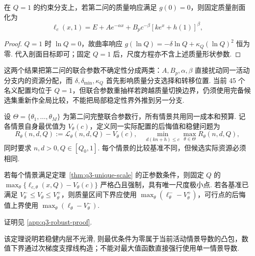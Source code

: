 \begin{corollary}[质量饱和分支的形状参数隔离]\label{cor:q3-saturated-shape-isolation}
在 $Q=1$ 的约束分支上，若第二问的质量响应满足 $g(0)=0$，则固定质量剖面化为
\[
\ell_c(x,1)=E+Ae^{-\alpha x}+B_pc^{-\beta}[ke^x+h(1)]^{\beta},
\]
\end{corollary}
\begin{proof}
$Q=1$ 时 $\ln Q=0$，故曲率响应 $g(\ln Q)=-\delta\ln Q+\kappa_Q(\ln Q)^2$ 恒为零. 代入剖面目标即可；固定 $Q=1$ 后，尺度方程亦不含上述质量形状参数. 
\end{proof}
这两个结果把第二问的联合参数不确定性分成两类：$A,B_p,\alpha,\beta$ 直接扰动同一活动分支内的资源分配，而 $\delta,\delta_{\min},\kappa_Q$ 首先影响质量分支选择和转移位置. 当前 45 个名义配置均位于 $Q=1$，但联合参数重抽样若跨越质量切换边界，仍须使用完备候选集重新作全局比较，不能把局部稳定性界外推到另一分支. 

\begin{definition}[有限参数情景的最大后悔值]\label{def:q3-minimax-regret}
设 $\Theta=\{\theta_1,\ldots,\theta_M\}$ 为第二问完整联合参数行，所有情景共用同一成本和预算. 记各情景自身最优值为 $V_\theta(c)$，定义同一实际配置的后悔值和稳健问题为
\begin{equation}\label{eq:q3-regret-v26}
R_\theta(n,d,Q):=\mathcal L_\theta(n,d,Q)-V_\theta(c),
\quad \min_{d(kn+h)\le c}\max_{\theta\in\Theta}R_\theta(n,d,Q),
\end{equation}
同时要求 $n,d>0,Q\in[Q_0,1]$. 每个情景的比较基准不同，但候选实际资源必须相同. 
\end{definition}

\begin{lemma}[稳健尺度内层的唯一性及数值误差传递]\label{prop:q3-robust-convex}
若每个情景满足定理~\ref{thm:q3-unique-scale} 的正参数条件，则固定 $Q$ 的 $\max_\theta\{\ell_{c,\theta}(x,Q)-V_\theta(c)\}$ 严格凸且强制，具有唯一尺度极小点. 若各基准已满足 $V^-_\theta\le V_\theta\le V^+_\theta$，则质量区间下界应使用 $\max_\theta(\ell^-_\theta-V^+_\theta)$，可行点的后悔值上界使用 $\max_\theta(\ell_\theta-V^-_\theta)$. 
\end{lemma}
证明见 \ref{app:q3-robust-proof}. 

该定理说明若稳健内层不光滑, 则最优条件为零属于当前活动情景导数的凸包，数值下界通过次梯度支撑线构造；不能对最大值函数直接强行使用单一情景导数. 

